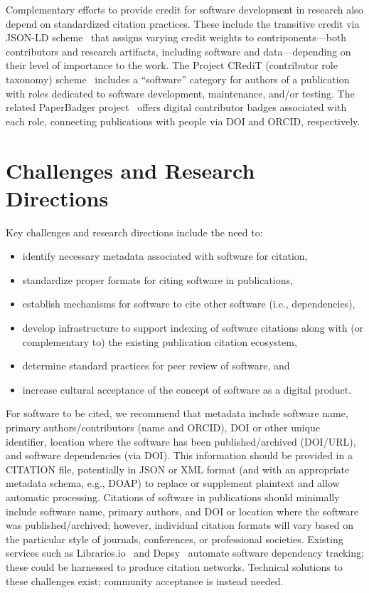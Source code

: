 \documentclass[letterpaper,10pt]{article}
\begin{document}
Complementary efforts to provide credit for software development in research also depend on standardized citation practices.
These include the transitive credit via JSON-LD scheme~\citep{Katz:2015aa} that assigns varying credit weights to contriponents---both contributors and research artifacts, including software and data---depending on their level of importance to the work.
The Project CRediT (contributor role taxonomy) scheme~\citep{project_credit} includes a ``software'' category for authors of a publication with roles dedicated to software development, maintenance, and\slash or testing.
The related PaperBadger project~\citep{PaperBadger} offers digital contributor badges associated with each role, connecting publications with people via DOI and ORCID, respectively.

\section{Challenges and Research Directions}

Key challenges and research directions include the need to:
\begin{itemize}
\item identify necessary metadata associated with software for citation,
\item standardize proper formats for citing software in publications,
\item establish mechanisms for software to cite other software (i.e., dependencies),
\item develop infrastructure to support indexing of software citations along with (or complementary to) the existing publication citation ecosystem,
\item determine standard practices for peer review of software, and
\item increase cultural acceptance of the concept of software as a digital product.
\end{itemize}

For software to be cited, we recommend that metadata include software name, primary authors\slash contributors (name and ORCID), DOI or other unique identifier, location where the software has been published\slash archived (DOI\slash URL), and software dependencies (via DOI).
This information should be provided in a CITATION file, potentially in JSON or XML format (and with an appropriate metadata schema, e.g., DOAP) to replace or supplement plaintext and allow automatic processing.
Citations of software in publications should minimally include software name, primary authors, and DOI or location where the software was published\slash archived; however, individual citation formats will vary based on the particular style of journals, conferences, or professional societies.
Existing services such as Libraries.io~\citep{Libraries.io} and Depsy~\citep{Depsy} automate software dependency tracking; these could be harnessed to produce citation networks.
Technical solutions to these challenges exist; community acceptance is instead needed.
\end{document}
